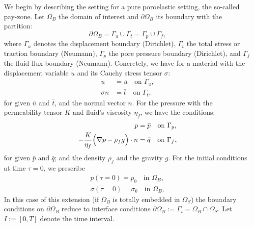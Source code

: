 We begin by describing the setting for a pure poroelastic setting, 
the so-called pay-zone.
Let $\Omega_B$ the domain of interest and $\partial\Omega_B$ its boundary
with the partition:
\begin{equation*}
\partial\Omega_B = \Gamma_u \cup \Gamma_t = \Gamma_p \cup \Gamma_f,
\end{equation*}
where $\Gamma_u$ denotes the displacement boundary (Dirichlet), $\Gamma_t$ the 
total stress or traction boundary (Neumann), $\Gamma_p$ the pore 
pressure boundary (Dirichlet), and $\Gamma_f$ the fluid flux boundary
(Neumann). Concretely, we have for a material 
with the displacement variable $u$ and its 
Cauchy stress tensor $\sigma$:
\begin{align*}
u &= \bar{u} \quad \text{on } \Gamma_u, \\
\sigma n &= \bar{t} \quad \text{on } \Gamma_t, 
\end{align*}
for given $\bar{u}$ and $\bar{t}$, and the 
normal vector $n$. 
For the pressure with the permeability tensor 
$K$ and fluid's viscosity $\eta_f$, we have the conditions:
\begin{align*}
p &= \bar{p} \quad \text{on } \Gamma_p, \\
- \frac{K}{\eta_f} \Bigl( \nabla p - \rho_f g\Bigr) \cdot n &= \bar{q}\quad \text{on } \Gamma_f,
\end{align*}
for given $\bar{p}$ and $\bar{q}$; and the density $\rho_f$ and the gravity $g$.
For the initial conditions at time $\tau=0$, we prescribe
\begin{align*}
p(\tau =0) = p_0 \quad \text{in } \Omega_B,\\
\sigma(\tau =0) = \sigma_0 \quad \text{in } \Omega_B,
\end{align*}
In this case of this extension
(if $\Omega_B$ is totally embedded in $\Omega_S$)
the boundary conditions on $\partial\Omega_B$ reduce 
to interface conditions $\partial\Omega_B :=\Gamma_i =
\Omega_B \cap \Omega_S$.
Let $I:=[0,T]$ denote the time interval.

